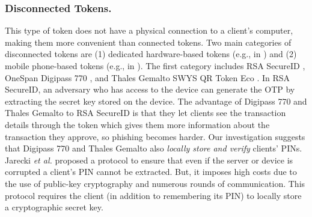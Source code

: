 \vspace{-4mm}
\subsubsection{Disconnected Tokens.}
\vspace{-2mm}
%
This type of token does not have a physical connection to a client's computer, making them more convenient than connected tokens. Two main categories of disconnected tokens are (1) dedicated hardware-based tokens (e.g., in \cite{secureID,Digipass-website,Gemalto}) and (2) mobile phone-based tokens (e.g., in \cite{SARA22,KoganMB17,KonothFFARB20}). The first category includes RSA SecureID \cite{secureID}, OneSpan Digipass 770 \cite{Digipass-website}, and Thales Gemalto SWYS QR Token Eco \cite{Gemalto}. In RSA SecureID, an adversary who has access to the device can generate the OTP by extracting the secret key stored on the device.  The advantage of  Digipass 770 and Thales Gemalto to RSA SecureID is that they let clients see the transaction details through the token which gives them more information about the transaction they approve, so phishing becomes harder. 
%
Our investigation suggests that Digipass 770 and Thales Gemalto also \emph{locally store and verify} clients' PINs. Jarecki \textit{et al.} \cite{JareckiJKSS21} proposed a protocol to ensure that even if the server or device is corrupted a client's PIN cannot be extracted. But, it imposes high costs due to the use of public-key cryptography and numerous rounds of communication. This protocol requires the client (in addition to remembering its PIN) to locally store a cryptographic secret key. 







%

